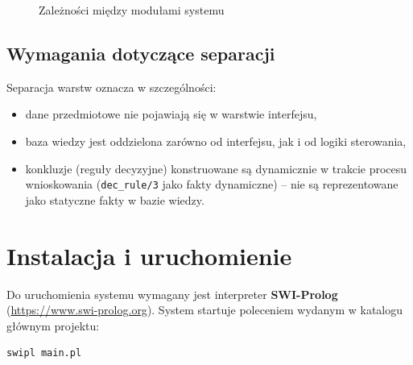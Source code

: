 \documentclass[11pt,a4paper]{article}
\newcommand{\code}[1]{\texttt{#1}}
\begin{document}
\begin{figure}[h]
\centering
{}
\caption{Zależności między modułami systemu}
\end{figure}

\subsection{Wymagania dotyczące separacji}
Separacja warstw oznacza w szczególności:
\begin{itemize}[noitemsep]
    \item dane przedmiotowe nie pojawiają się w warstwie interfejsu,
    \item baza wiedzy jest oddzielona zarówno od interfejsu, jak i od logiki
          sterowania,
    \item konkluzje (reguły decyzyjne) konstruowane są dynamicznie w trakcie
          procesu wnioskowania (\code{dec\_rule/3} jako fakty dynamiczne) --
          nie są reprezentowane jako statyczne fakty w bazie wiedzy.
\end{itemize}

\section{Instalacja i uruchomienie}
Do uruchomienia systemu wymagany jest interpreter \textbf{SWI-Prolog}
(\url{https://www.swi-prolog.org}). System startuje poleceniem wydanym
w katalogu głównym projektu:
\begin{lstlisting}[language=bash]
swipl main.pl
\end{lstlisting}
\end{document}
